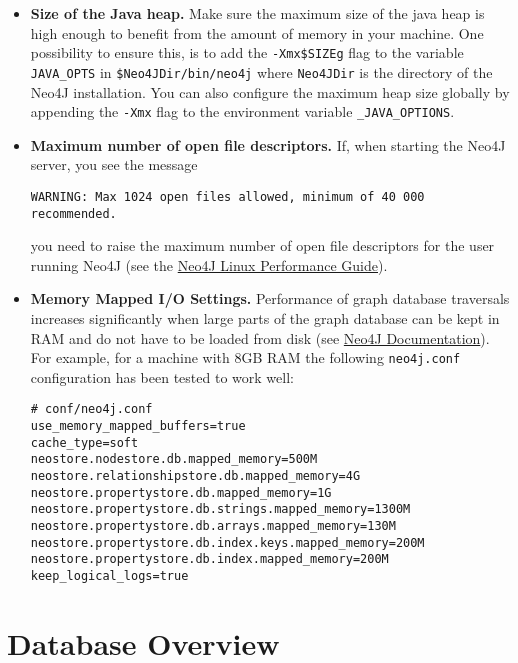\documentclass[a4paper]{article}
\newcommand{\code}[1]{\texttt{\small #1}}
\begin{document}
\begin{itemize}
  
  \item \textbf{Size of the Java heap.} Make sure the maximum size of
    the java heap is high enough to benefit from the amount of memory in
    your machine. One possibility to ensure this, is to add the
    \code{-Xmx\$SIZEg} flag to the variable \code{JAVA\_OPTS} in
    \code{\$Neo4JDir/bin/neo4j} where \code{Neo4JDir} is the directory of
    the Neo4J installation. You can also configure the maximum heap size
    globally by appending the \code{-Xmx} flag to the environment variable
    \code{\_JAVA\_OPTIONS}.
    
  \item \textbf{Maximum number of open file descriptors.} If, when
    starting the Neo4J server, you see the message

    \small{
\begin{verbatim}
WARNING: Max 1024 open files allowed, minimum of 40 000 recommended.
\end{verbatim}
    }
    you need to raise the maximum number of open file
    descriptors for the user running Neo4J (see the
    \href{http://docs.neo4j.org/chunked/stable/linux-performance-guide.html}{Neo4J
      Linux Performance Guide}).

  \item \textbf{Memory Mapped I/O Settings.} Performance of graph
    database traversals increases significantly when large parts of
    the graph database can be kept in RAM and do not have to be loaded
    from disk (see
    \href{http://docs.neo4j.org/chunked/stable/configuration-io-examples.html}{Neo4J
    Documentation}). For example, for a machine with 8GB RAM the
  following  \code{neo4j.conf} configuration has been tested to work
  well:
\begin{verbatim}
# conf/neo4j.conf
use_memory_mapped_buffers=true
cache_type=soft
neostore.nodestore.db.mapped_memory=500M
neostore.relationshipstore.db.mapped_memory=4G
neostore.propertystore.db.mapped_memory=1G
neostore.propertystore.db.strings.mapped_memory=1300M
neostore.propertystore.db.arrays.mapped_memory=130M
neostore.propertystore.db.index.keys.mapped_memory=200M
neostore.propertystore.db.index.mapped_memory=200M
keep_logical_logs=true
\end{verbatim}
    
  \end{itemize}

\section{Database Overview}
\label{sec:dbOverview}
\end{document}
